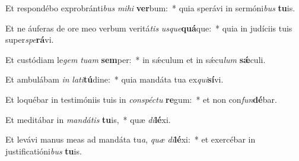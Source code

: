\item Et respondébo exprobránti\textit{bus} \textit{mi}\textit{hi} \textbf{ver}bum:~* quia sperávi in sermóni\textit{bus} \textbf{tu}is.
\item Et ne áuferas de ore meo verbum veritá\textit{tis} \textit{us}\textit{que}\textbf{quá}que:~* quia in judíciis tuis super\textit{spe}\textbf{rá}vi.
\item Et custódiam le\textit{gem} \textit{tu}\textit{am} \textbf{sem}per:~* in sǽculum et in sǽcu\textit{lum} \textbf{sǽ}culi.
\item Et ambulábam \textit{in} \textit{la}\textit{ti}\textbf{tú}dine:~* quia mandáta tua ex\textit{qui}\textbf{sí}vi.
\item Et loquébar in testimóniis tuis in \textit{con}\textit{spéc}\textit{tu} \textbf{re}gum:~* et non con\textit{fun}\textbf{dé}bar.
\item Et meditábar in \textit{man}\textit{dá}\textit{tis} \textbf{tu}is,~* quæ \textit{di}\textbf{lé}xi.
\item Et levávi manus meas ad mandáta tu\textit{a}, \textit{quæ} \textit{di}\textbf{lé}xi:~* et exercébar in justificatióni\textit{bus} \textbf{tu}is.

